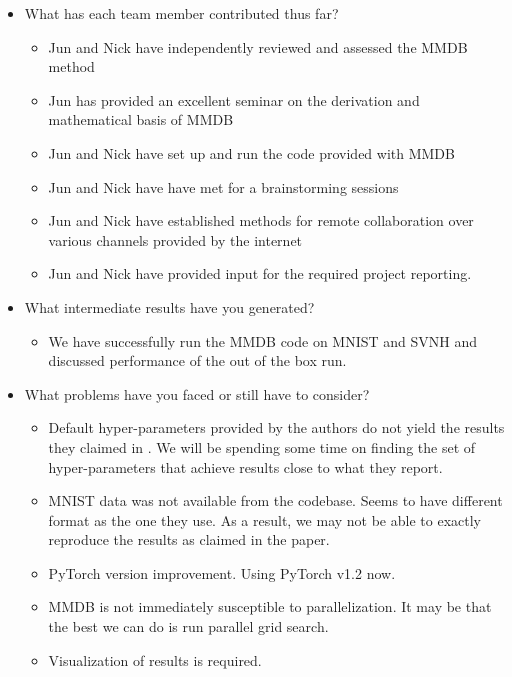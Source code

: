 \begin{itemize}
    \item What has each team member contributed thus far?
        \begin{itemize}
        \item Jun and Nick have independently reviewed and assessed the MMDB method
        \item Jun has provided an excellent seminar on the derivation and mathematical basis of MMDB
        \item Jun and Nick have set up and run the code provided with MMDB
        \item Jun and Nick have have met for a brainstorming sessions
        \item Jun and Nick have established methods for remote collaboration over various channels provided by the internet
        \item Jun and Nick have provided input for the required project reporting.
        \end{itemize}  
    \item What intermediate results have you generated?
        \begin{itemize}
        \item We have successfully run the MMDB code on MNIST and SVNH and discussed performance of the out of the box run.
        \end{itemize}
    \item What problems have you faced or still have to consider?
    \begin{itemize}
        \item Default hyper-parameters provided by the authors do not yield the results they claimed in \cite{kim2019unsupervised}. We will be spending some time on finding the set of hyper-parameters that achieve results close to what they report.
        \item MNIST data was not available from the codebase. Seems to have different format as the one they use. As a result, we may not be able to exactly reproduce the results as claimed in the paper.
        \item PyTorch version improvement. Using PyTorch v1.2 now.
        \item MMDB is not immediately susceptible to parallelization. It may be that the best we can do is run parallel grid search. 
        \item Visualization of results is required.
    \end{itemize}
\end{itemize}



